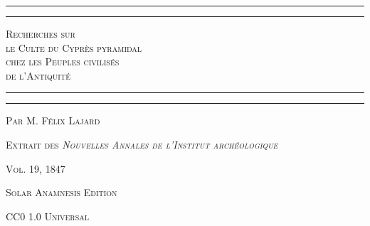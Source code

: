 \documentclass[a4paper, 11pt, oneside, polutonikogreek, french]{article}
\begin{document}
\renewcommand\thefootnote{\tiny{\arabic{footnote}}}
\let\oldfootnote\footnote
    \renewcommand{\footnote}[1]{\oldfootnote{\bfseries\scriptsize#1}}
\bfseries
{}
\pagestyle{plain}
\begin{titlepage} %
	\centering %

	
	\rule{\textwidth}{1.6pt}\vspace*{-\baselineskip}\vspace*{2pt} %
	\rule{\textwidth}{0.4pt} %
	
	{\scshape\Large Recherches sur \\ le Culte du Cyprès pyramidal\\ chez les Peuples civilisés \\ de l'Antiquité}
	
	\rule{\textwidth}{0.4pt}\vspace*{-\baselineskip}\vspace{3.2pt} %
	\rule{\textwidth}{1.6pt} %

	
	\vspace{0.25\baselineskip}
	
	{\small\scshape Par \normalsize M. Félix Lajard} %
	
    \vspace*{\fill} 
	
	

	\vspace{0.25\baselineskip}

	{\footnotesize\scshape Extrait des \emph{Nouvelles Annales de l'Institut archéologique}}
	
	{\footnotesize\scshape{Vol. 19, 1847}}
	
	\vspace{0.25\baselineskip} %

    {\footnotesize\scshape Solar Anamnesis Edition}  %
	
	{\scshape\footnotesize CC0 1.0 Universal} %
\end{titlepage}
\setlength{\parskip}{1mm plus1mm minus1mm}
\setcounter{tocdepth}{3}
\setcounter{secnumdepth}{3}
\small
\tableofcontents
\clearpage
\listoffigures
\clearpage
\end{document}
